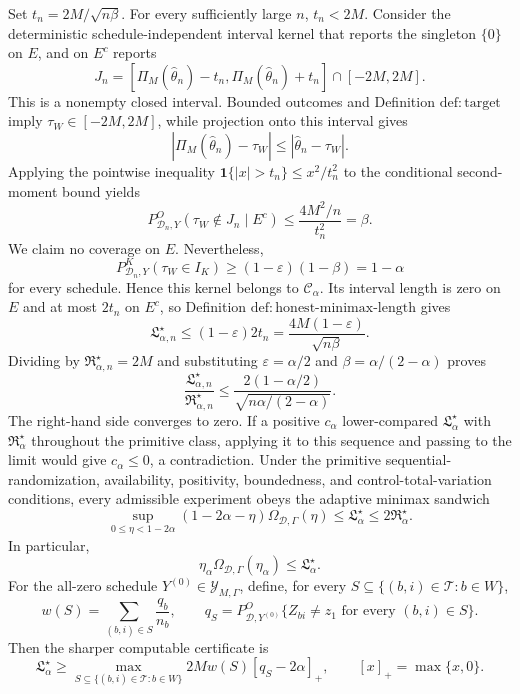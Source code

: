 Set \(t_n=2M/\sqrt{n\beta}\).  For every sufficiently large \(n\), \(t_n<2M\).  Consider the deterministic schedule-independent interval kernel that reports the singleton \(\{0\}\) on \(E\), and on \(E^c\) reports
\[
 J_n=
 [\Pi_M(\widehat\theta_n)-t_n,
   \Pi_M(\widehat\theta_n)+t_n]
 \cap[-2M,2M].
\]
This is a nonempty closed interval.  Bounded outcomes and Definition \(\mathrm{def:target}\) imply \(\tau_W\in[-2M,2M]\), while projection onto this interval gives
\[
 |\Pi_M(\widehat\theta_n)-\tau_W|
 \le|\widehat\theta_n-\tau_W|.
\]
Applying the pointwise inequality \(\mathbf 1\{|x|>t_n\}\le x^2/t_n^2\) to the conditional second-moment bound yields
\[
 P^O_{\mathcal D_n,Y}(\tau_W\notin J_n\mid E^c)
 \le\frac{4M^2/n}{t_n^2}=\beta.
\]
We claim no coverage on \(E\).  Nevertheless,
\[
 P^K_{\mathcal D_n,Y}(\tau_W\in I_K)
 \ge(1-\varepsilon)(1-\beta)=1-\alpha
\]
for every schedule.  Hence this kernel belongs to \(\mathcal C_\alpha\).  Its interval length is zero on \(E\) and at most \(2t_n\) on \(E^c\), so Definition \(\mathrm{def:honest\text{-}minimax\text{-}length}\) gives
\[
 \mathfrak L_{\alpha,n}^\star
 \le(1-\varepsilon)2t_n
 =\frac{4M(1-\varepsilon)}{\sqrt{n\beta}}.
\]
Dividing by \(\mathfrak R_{\alpha,n}^\star=2M\) and substituting \(\varepsilon=\alpha/2\) and \(\beta=\alpha/(2-\alpha)\) proves
\[
 \frac{\mathfrak L_{\alpha,n}^\star}{\mathfrak R_{\alpha,n}^\star}
 \le
 \frac{2(1-\alpha/2)}{\sqrt{n\alpha/(2-\alpha)}}.
\]
The right-hand side converges to zero.  If a positive \(c_\alpha\) lower-compared \(\mathfrak L_\alpha^\star\) with \(\mathfrak R_\alpha^\star\) throughout the primitive class, applying it to this sequence and passing to the limit would give \(c_\alpha\le0\), a contradiction.
Under the primitive sequential-randomization, availability, positivity, boundedness, and control-total-variation conditions, every admissible experiment obeys the adaptive minimax sandwich
\[
 \sup_{0\le\eta<1-2\alpha}
 (1-2\alpha-\eta)\Omega_{\mathcal D,\Gamma}(\eta)
 \le \mathfrak L_\alpha^\star
 \le2\mathfrak R_\alpha^\star.
\]
In particular,
\[
 \eta_\alpha\Omega_{\mathcal D,\Gamma}(\eta_\alpha)
 \le\mathfrak L_\alpha^\star.
\]
For the all-zero schedule \(Y^{(0)}\in\mathcal Y_{M,\Gamma}\), define, for every \(S\subseteq\{(b,i)\in\mathcal T:b\in W\}\),
\[
 w(S)=\sum_{(b,i)\in S}\frac{q_b}{n_b},
 \qquad
 q_S=P^O_{\mathcal D,Y^{(0)}}\{Z_{bi}\ne z_1\text{ for every }(b,i)\in S\}.
\]
Then the sharper computable certificate is
\[
 \mathfrak L_\alpha^\star
 \ge
 \max_{S\subseteq\{(b,i)\in\mathcal T:b\in W\}}
 2Mw(S)[q_S-2\alpha]_+,
 \qquad [x]_+=\max\{x,0\}.
\]

